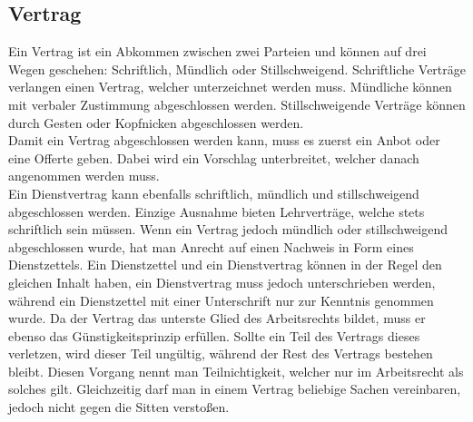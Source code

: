 \documentclass{article}
\begin{document}
	\subsection{Vertrag}
	Ein Vertrag ist ein Abkommen zwischen zwei Parteien und können auf drei Wegen geschehen: Schriftlich, Mündlich oder Stillschweigend. Schriftliche Verträge verlangen einen Vertrag, welcher unterzeichnet werden muss. Mündliche können mit verbaler Zustimmung abgeschlossen werden. Stillschweigende Verträge können durch Gesten oder Kopfnicken abgeschlossen werden. \\
	Damit ein Vertrag abgeschlossen werden kann, muss es zuerst ein Anbot oder eine Offerte geben. Dabei wird ein Vorschlag unterbreitet, welcher danach angenommen werden muss. \\
	Ein Dienstvertrag kann ebenfalls schriftlich, mündlich und stillschweigend abgeschlossen werden. Einzige Ausnahme bieten Lehrverträge, welche stets schriftlich sein müssen. Wenn ein Vertrag jedoch mündlich oder stillschweigend abgeschlossen wurde, hat man Anrecht auf einen Nachweis in Form eines Dienstzettels. Ein Dienstzettel und ein Dienstvertrag können in der Regel den gleichen Inhalt haben, ein Dienstvertrag muss jedoch unterschrieben werden, während ein Dienstzettel mit einer Unterschrift nur zur Kenntnis genommen wurde. Da der Vertrag das unterste Glied des Arbeitsrechts bildet, muss er ebenso das Günstigkeitsprinzip erfüllen. Sollte ein Teil des Vertrags dieses verletzen, wird dieser Teil ungültig, während der Rest des Vertrags bestehen bleibt. Diesen Vorgang nennt man Teilnichtigkeit, welcher nur im Arbeitsrecht als solches gilt. Gleichzeitig darf man in einem Vertrag beliebige Sachen vereinbaren, jedoch nicht gegen die Sitten verstoßen.
\end{document}
